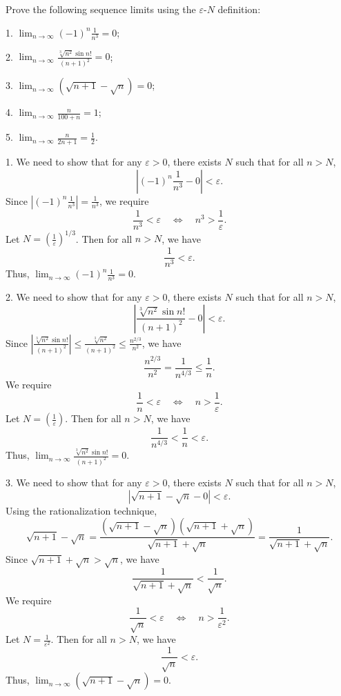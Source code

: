 %
\begin{exercise}
Prove the following sequence limits using the \(\varepsilon\)-\(N\) definition:

1. $\lim_{n \rightarrow \infty}(-1)^{n} \frac{1}{n^{3}}=0$;

2. $\lim_{n \rightarrow \infty} \frac{\sqrt[3]{n^{2}} \sin n!}{(n+1)^{2}}=0$;

3. $\lim_{n \rightarrow \infty}(\sqrt{n+1}-\sqrt{n})=0$;

4. $\lim_{n \rightarrow \infty} \frac{n}{100+n}=1$;

5. $\lim_{n \rightarrow \infty} \frac{n}{2n+1}=\frac{1}{2}$.
\end{exercise}
\begin{solution}

1. We need to show that for any \(\varepsilon > 0\), there exists \(N\) such that for all \(n > N\),
\[
\left| (-1)^{n} \frac{1}{n^{3}} - 0 \right| < \varepsilon.
\]
Since \(\left| (-1)^{n} \frac{1}{n^{3}} \right| = \frac{1}{n^{3}}\), we require
\[
\frac{1}{n^{3}} < \varepsilon \quad \Leftrightarrow \quad n^{3} > \frac{1}{\varepsilon}.
\]
Let \(N = \left( \frac{1}{\varepsilon} \right)^{1/3}\). Then for all \(n > N\), we have
\[
\frac{1}{n^{3}} < \varepsilon.
\]
Thus, \(\lim_{n \to \infty} (-1)^{n} \frac{1}{n^{3}} = 0\).

2. We need to show that for any \(\varepsilon > 0\), there exists \(N\) such that for all \(n > N\),
\[
\left| \frac{\sqrt[3]{n^{2}} \sin n!}{(n+1)^{2}} - 0 \right| < \varepsilon.
\]
Since \(\left| \frac{\sqrt[3]{n^{2}} \sin n!}{(n+1)^{2}} \right| \leq \frac{\sqrt[3]{n^{2}}}{(n+1)^{2}} \leq \frac{n^{2/3}}{n^2}\), we have
\[
\frac{n^{2/3}}{n^2} = \frac{1}{n^{4/3}} \leq \frac{1}{n}.
\]
We require
\[
\frac{1}{n} < \varepsilon \quad \Leftrightarrow \quad n > \frac{1}{\varepsilon}.
\]
Let \(N = \left( \frac{1}{\varepsilon} \right)\). Then for all \(n > N\), we have
\[
\frac{1}{n^{4/3}} < \frac{1}{n} < \varepsilon.
\]
Thus, \(\lim_{n \to \infty} \frac{\sqrt[3]{n^{2}} \sin n!}{(n+1)^{2}} = 0\).

3. We need to show that for any \(\varepsilon > 0\), there exists \(N\) such that for all \(n > N\),
\[
\left| \sqrt{n+1} - \sqrt{n} - 0 \right| < \varepsilon.
\]
Using the rationalization technique,
\[
\sqrt{n+1} - \sqrt{n} = \frac{(\sqrt{n+1} - \sqrt{n})(\sqrt{n+1} + \sqrt{n})}{\sqrt{n+1} + \sqrt{n}} = \frac{1}{\sqrt{n+1} + \sqrt{n}}.
\]
Since \(\sqrt{n+1} + \sqrt{n} > \sqrt{n}\), we have
\[
\frac{1}{\sqrt{n+1} + \sqrt{n}} < \frac{1}{\sqrt{n}}.
\]
We require
\[
\frac{1}{\sqrt{n}} < \varepsilon \quad \Leftrightarrow \quad n > \frac{1}{\varepsilon^2}.
\]
Let \(N = \frac{1}{\varepsilon^2}\). Then for all \(n > N\), we have
\[
\frac{1}{\sqrt{n}} < \varepsilon.
\]
Thus, \(\lim_{n \to \infty} (\sqrt{n+1} - \sqrt{n}) = 0\).


\end{solution}
